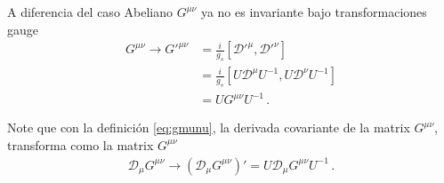 A diferencia del caso Abeliano $G^{\mu\nu}$ ya no es invariante bajo transformaciones gauge
\begin{align}
G^{\mu\nu}\to    {G'}^{\mu\nu}
  &=\frac{i}{g_s}\left[{\mathcal{D}'}^\mu,{\mathcal{D}'}^\nu\right]\nonumber\\
&=\frac{i}{g_s}\left[U{\mathcal{D}}^\mu U^{-1},U{\mathcal{D}}^\nu U^{-1}\right]\nonumber\\
&=U{{G}}^{\mu\nu}U^{-1}\,.
\end{align}

Note que con la definición \eqref{eq:gmunu}, la derivada covariante de la matrix $G^{\mu\nu}$, transforma como la matrix $G^{\mu\nu}$
\begin{align}
\mathcal{D}_\mu G^{\mu\nu} \to\left(\mathcal{D}_\mu G^{\mu\nu}\right)'=U\mathcal{D}_\mu G^{\mu\nu} U^{-1}\,.
\end{align}


